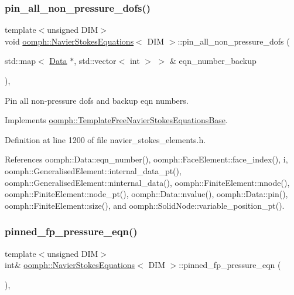 \subsubsection{\texorpdfstring{pin\+\_\+all\+\_\+non\+\_\+pressure\+\_\+dofs()}{pin\_all\_non\_pressure\_dofs()}}
{\footnotesize\ttfamily template$<$unsigned D\+IM$>$ \\
void \hyperlink{classoomph_1_1NavierStokesEquations}{oomph\+::\+Navier\+Stokes\+Equations}$<$ D\+IM $>$\+::pin\+\_\+all\+\_\+non\+\_\+pressure\+\_\+dofs (\begin{DoxyParamCaption}\item[{std\+::map$<$ \hyperlink{classoomph_1_1Data}{Data} $\ast$, std\+::vector$<$ int $>$ $>$ \&}]{eqn\+\_\+number\+\_\+backup }\end{DoxyParamCaption})\hspace{0.3cm}{\ttfamily [inline]}, {\ttfamily [virtual]}}



Pin all non-\/pressure dofs and backup eqn numbers. 



Implements \hyperlink{classoomph_1_1TemplateFreeNavierStokesEquationsBase_a4db23eff5a82f7b8478c7f9d21857d0a}{oomph\+::\+Template\+Free\+Navier\+Stokes\+Equations\+Base}.



Definition at line 1200 of file navier\+\_\+stokes\+\_\+elements.\+h.



References oomph\+::\+Data\+::eqn\+\_\+number(), oomph\+::\+Face\+Element\+::face\+\_\+index(), i, oomph\+::\+Generalised\+Element\+::internal\+\_\+data\+\_\+pt(), oomph\+::\+Generalised\+Element\+::ninternal\+\_\+data(), oomph\+::\+Finite\+Element\+::nnode(), oomph\+::\+Finite\+Element\+::node\+\_\+pt(), oomph\+::\+Data\+::nvalue(), oomph\+::\+Data\+::pin(), oomph\+::\+Finite\+Element\+::size(), and oomph\+::\+Solid\+Node\+::variable\+\_\+position\+\_\+pt().

\mbox{\label{classoomph_1_1NavierStokesEquations_aa013a7e3d96ca1f1db6817298222650e}} 
\subsubsection{\texorpdfstring{pinned\+\_\+fp\+\_\+pressure\+\_\+eqn()}{pinned\_fp\_pressure\_eqn()}}
{\footnotesize\ttfamily template$<$unsigned D\+IM$>$ \\
int\& \hyperlink{classoomph_1_1NavierStokesEquations}{oomph\+::\+Navier\+Stokes\+Equations}$<$ D\+IM $>$\+::pinned\+\_\+fp\+\_\+pressure\+\_\+eqn (\begin{DoxyParamCaption}{ }\end{DoxyParamCaption})\hspace{0.3cm}{\ttfamily [inline]}, {\ttfamily [virtual]}}



